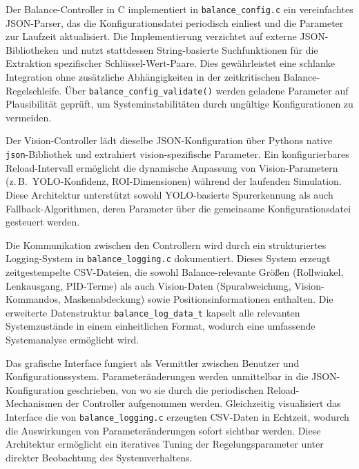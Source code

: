   Der Balance-Controller in C implementiert in \texttt{balance\_config.c} ein vereinfachtes JSON-Parser, 
  das die Konfigurationsdatei periodisch einliest und die Parameter zur Laufzeit aktualisiert. Die Implementierung verzichtet auf externe 
  JSON-Bibliotheken und nutzt stattdessen String-basierte Suchfunktionen für die Extraktion spezifischer Schlüssel-Wert-Paare. Dies gewährleistet 
  eine schlanke Integration ohne zusätzliche Abhängigkeiten in der zeitkritischen Balance-Regelschleife. Über \texttt{balance\_config\_validate()} 
  werden geladene Parameter auf Plausibilität geprüft, um Systeminstabilitäten durch ungültige Konfigurationen zu vermeiden.

  Der Vision-Controller lädt dieselbe JSON-Konfiguration über Pythons native \texttt{json}-Bibliothek 
  und extrahiert vision-spezifische Parameter. Ein konfigurierbares Reload-Intervall ermöglicht die dynamische Anpassung von Vision-Parametern 
  (z.\,B.\ YOLO-Konfidenz, ROI-Dimensionen) während der laufenden Simulation. Diese Architektur unterstützt sowohl YOLO-basierte Spurerkennung 
  als auch Fallback-Algorithmen, deren Parameter über die gemeinsame Konfigurationsdatei gesteuert werden.

  Die Kommunikation zwischen den Controllern wird durch ein strukturiertes Logging-System in 
  \texttt{balance\_logging.c} dokumentiert. Dieses System erzeugt zeitgestempelte CSV-Dateien, die sowohl Balance-relevante Größen (Rollwinkel, 
  Lenkausgang, PID-Terme) als auch Vision-Daten (Spurabweichung, Vision-Kommandos, Maskenabdeckung) sowie Positionsinformationen enthalten. 
  Die erweiterte Datenstruktur \texttt{balance\_log\_data\_t} kapselt alle relevanten Systemzustände in einem einheitlichen Format, wodurch 
  eine umfassende Systemanalyse ermöglicht wird.

  Das grafische Interface fungiert als Vermittler zwischen Benutzer und Konfigurationssystem. Parameteränderungen werden 
  unmittelbar in die JSON-Konfiguration geschrieben, von wo sie durch die periodischen Reload-Mechanismen der Controller aufgenommen werden. 
  Gleichzeitig visualisiert das Interface die von \texttt{balance\_logging.c} erzeugten CSV-Daten in Echtzeit, wodurch die Auswirkungen von 
  Parameteränderungen sofort sichtbar werden. Diese Architektur ermöglicht ein iteratives Tuning der Regelungsparameter unter direkter 
  Beobachtung des Systemverhaltens.


 





